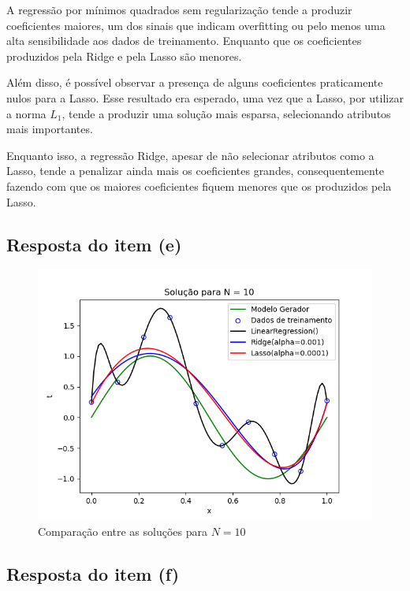A regressão por mínimos quadrados sem regularização tende a produzir coeficientes maiores, um dos sinais que indicam overfitting ou pelo menos uma alta sensibilidade aos dados de treinamento. Enquanto que os coeficientes produzidos pela Ridge e pela Lasso são menores.

Além disso, é possível observar a presença de alguns coeficientes praticamente nulos para a Lasso. Esse resultado era esperado, uma vez que a Lasso, por utilizar a norma $L_1$, tende a produzir uma solução mais esparsa, selecionando atributos mais importantes.

Enquanto isso, a regressão Ridge, apesar de não selecionar atributos como a Lasso, tende a penalizar ainda mais os coeficientes grandes, consequentemente fazendo com que os maiores coeficientes fiquem menores que os produzidos pela Lasso.



\subsection{Resposta do item (e)}
\begin{figure}[H]
    \centering
    \caption{Comparação entre as soluções para $N=10$}
    \includegraphics[width=12cm]{E1_e.png}
\end{figure}

\subsection{Resposta do item (f)}

